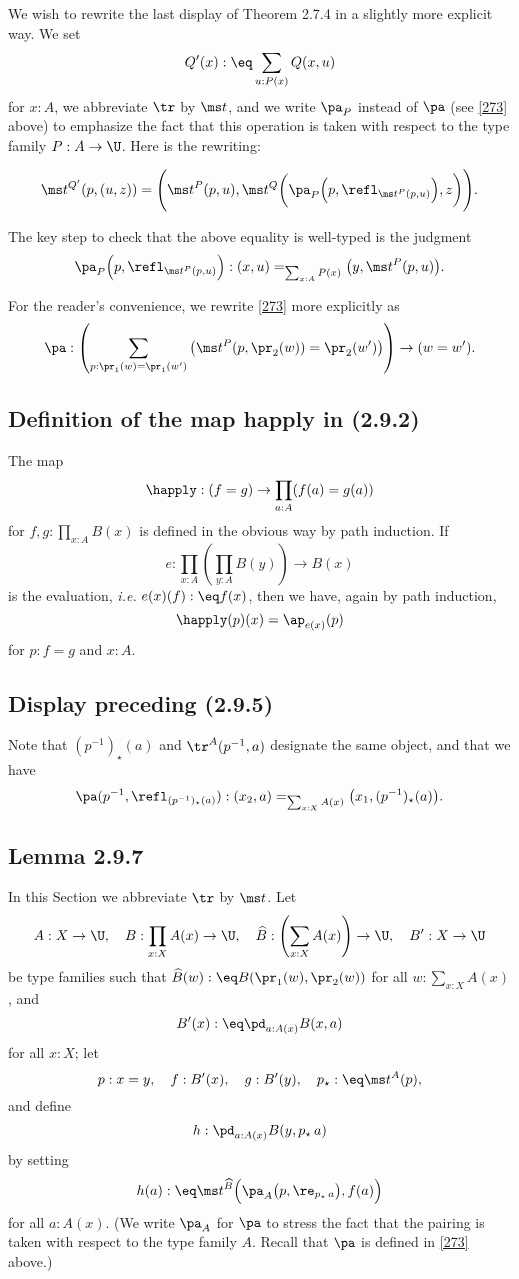 \documentclass[12pt]{article}
\begin{document}
We wish to rewrite the last display of Theorem 2.7.4 in a slightly more explicit way. We set 
$$
Q'(x):\eq\sum_{u:P(x)}Q(x,u)
$$ 
for $x:A$, we abbreviate $\tr$ by $\ms t$, and we write $\pa_P$ instead of $\pa$ (see \eqref{273} above) to emphasize the fact that this operation is taken with respect to the type family $P:A\to\U$. Here is the rewriting:

$$
\ms t^{Q'}(p,(u,z))=\Bigg(\ms t^P(p,u),\ms t^Q\bigg(\pa_P\Big(p,\refl_{\ms t^P(p,u)}\Big),z\bigg)\Bigg).
$$ 

The key step to check that the above equality is well-typed is the judgment 
$$
\pa_P\Big(p,\refl_{\ms t^P(p,u)}\Big):(x,u)=_{\sum_{x:A}P(x)}\big(y,\ms t^P(p,u)\big).
$$ 

For the reader's convenience, we rewrite \eqref{273} more explicitly as 
$$
\pa:\left(\sum_{p:\pr_1(w)=\pr_1(w')}\big(\ms t^P(p,\pr_2(w))=\pr_2(w')\big)\right)\to(w=w').
$$


\subsection{Definition of the map \textsf{happly} in (2.9.2)}

The map 
$$
\happly:(f=g)\to\prod_{a:A}(f(a)=g(a))
$$ 
for $f,g:\prod_{x:A}B(x)$ is defined in the obvious way by path induction. If 
$$
e:\prod_{x:A}\left(\prod_{y:A}B(y)\right)\to B(x)
$$ 
is the evaluation, \emph{i.e.} $e(x)(f):\eq f(x)$, then we have, again by path induction, 
$$
\happly(p)(x)=\ap_{e(x)}(p)
$$ 
for $p:f=g$ and $x:A$. 


\subsection{Display preceding (2.9.5)}

Note that $(p^{-1})_\star(a)$ and $\tr^A(p^{-1},a)$ designate the same object, and that we have 
$$
\pa(p^{-1},\refl_{(p^{-1})_\star(a)}):(x_2,a)=_{\sum_{x:X}A(x)}\big(x_1,(p^{-1})_\star(a)\big).
$$ 


\subsection{Lemma 2.9.7}

In this Section we abbreviate $\tr$ by $\ms t$. Let 
$$
A:X\to\U,\quad B:\prod_{x:X}A(x)\to\U,\quad\widehat B:\left(\sum_{x:X}A(x)\right)\to\U,\quad B':X\to\U
$$ 
be type families such that $\widehat B(w):\eq B(\pr_1(w),\pr_2(w))$ for all $w:\sum_{x:X}A(x)$, and 
$$
B'(x):\eq\pd_{a:A(x)}B(x,a)
$$ 
for all $x:X$; let 
$$
p:x=y,\quad f:B'(x),\quad g:B'(y),\quad p_\star:\eq\ms t^A(p),
$$ 
and define 
$$
h:\pd_{a:A(x)}B(y,p_\star\,a)
$$ 
by setting 
$$
h(a):\eq\ms t^{\widehat B}\Big(\pa_A\big(p,\re_{p_\star\,a}\big),f(a)\Big)
$$ 
for all $a:A(x)$. (We write $\pa_A$ for $\pa$ to stress the fact that the pairing is taken with respect to the type family $A$. Recall that $\pa$ is defined in \eqref{273} above.)
\end{document}
